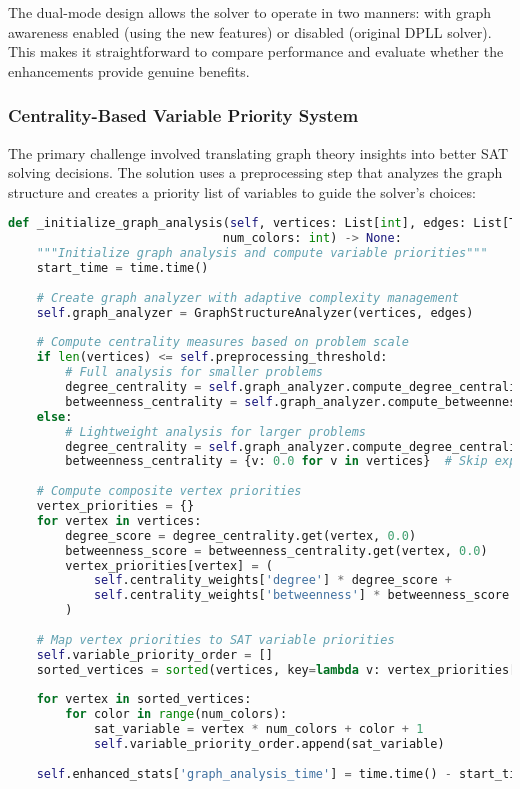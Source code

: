 The dual-mode design allows the solver to operate in two manners: with graph awareness enabled (using the new features) or disabled (original DPLL solver). This makes it straightforward to compare performance and evaluate whether the enhancements provide genuine benefits.

\subsubsection{Centrality-Based Variable Priority System}

The primary challenge involved translating graph theory insights into better SAT solving decisions. The solution uses a preprocessing step that analyzes the graph structure and creates a priority list of variables to guide the solver's choices:

\newpage
\begin{lstlisting}[language=Python, caption=Centrality-Based Variable Priority System]
def _initialize_graph_analysis(self, vertices: List[int], edges: List[Tuple[int, int]], 
                              num_colors: int) -> None:
    """Initialize graph analysis and compute variable priorities"""
    start_time = time.time()
    
    # Create graph analyzer with adaptive complexity management
    self.graph_analyzer = GraphStructureAnalyzer(vertices, edges)
    
    # Compute centrality measures based on problem scale
    if len(vertices) <= self.preprocessing_threshold:
        # Full analysis for smaller problems
        degree_centrality = self.graph_analyzer.compute_degree_centrality()
        betweenness_centrality = self.graph_analyzer.compute_betweenness_centrality()
    else:
        # Lightweight analysis for larger problems
        degree_centrality = self.graph_analyzer.compute_degree_centrality()
        betweenness_centrality = {v: 0.0 for v in vertices}  # Skip expensive computation
    
    # Compute composite vertex priorities
    vertex_priorities = {}
    for vertex in vertices:
        degree_score = degree_centrality.get(vertex, 0.0)
        betweenness_score = betweenness_centrality.get(vertex, 0.0)
        vertex_priorities[vertex] = (
            self.centrality_weights['degree'] * degree_score + 
            self.centrality_weights['betweenness'] * betweenness_score
        )
    
    # Map vertex priorities to SAT variable priorities
    self.variable_priority_order = []
    sorted_vertices = sorted(vertices, key=lambda v: vertex_priorities[v], reverse=True)
    
    for vertex in sorted_vertices:
        for color in range(num_colors):
            sat_variable = vertex * num_colors + color + 1
            self.variable_priority_order.append(sat_variable)
    
    self.enhanced_stats['graph_analysis_time'] = time.time() - start_time
\end{lstlisting}

